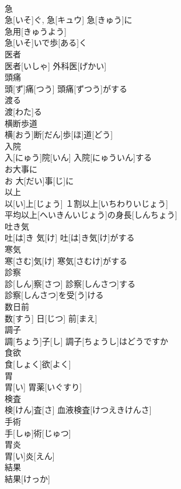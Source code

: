 \documentclass[8pt]{extreport}
\begin{document}
\begin{CJK}{UTF8}{min}
\\	急	
\\	急[いそ]ぐ, 急[キュウ]	急[きゅう]に 
\\	急用[きゅうよう] 
\\	急[いそ]いで歩[ある]く 
\\	医者	
\\	医者[いしゃ]	外科医[げかい] 
\\	頭痛	
\\	頭[ず]痛[つう]	頭痛[ずつう]がする 
\\	渡る	
\\	渡[わた]る	
\\	横断歩道	
\\	横[おう]断[だん]歩[ほ]道[どう]	
\\	入院	
\\	入[にゅう]院[いん]	入院[にゅういん]する 
\\	お大事に	
\\	お 大[だい]事[じ]に	
\\	以上	
\\	以[い]上[じょう]	１割以上[いちわりいじょう] 
\\	平均以上[へいきんいじょう]の身長[しんちょう] 
\\	吐き気	
\\	吐[は]き 気[け]	吐[は]き気[け]がする　
\\	寒気	
\\	寒[さむ]気[け]	寒気[さむけ]がする　
\\	診察	
\\	診[しん]察[さつ]	診察[しんさつ]する　
\\	診察[しんさつ]を受[う]ける　
\\	数日前	
\\	数[すう] 日[じつ] 前[まえ]	
\\	調子	
\\	調[ちょう]子[し]	調子[ちょうし]はどうですか 
\\	食欲	
\\	食[しょく]欲[よく]	
\\	胃	
\\	胃[い]	胃薬[いぐすり] 
\\	検査	
\\	検[けん]査[さ]	血液検査[けつえきけんさ] 
\\	手術	
\\	手[しゅ]術[じゅつ]	
\\	胃炎	
\\	胃[い]炎[えん]	
\\	結果	
\\	結果[けっか]	

\end{CJK}
\end{document}
